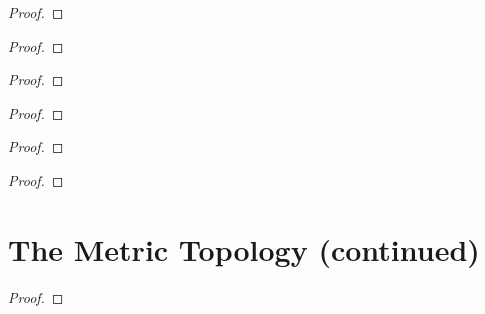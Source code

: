 \begin{proof}
\end{proof}


\begin{exercise}\label{chapter2:section20:exercise7}
\end{exercise}

\begin{proof}
\end{proof}


\begin{exercise}\label{chapter2:section20:exercise8}
\end{exercise}

\begin{proof}
\end{proof}


\begin{exercise}\label{chapter2:section20:exercise9}
\end{exercise}

\begin{proof}
\end{proof}


\begin{exercise}\label{chapter2:section20:exercise10}
\end{exercise}

\begin{proof}
\end{proof}


\begin{exercise}\label{chapter2:section20:exercise11}
\end{exercise}

\begin{proof}
\end{proof}


\section{The Metric Topology (continued)}

\begin{exercise}\label{chapter2:section21:exercise1}
\end{exercise}

\begin{proof}
\end{proof}


